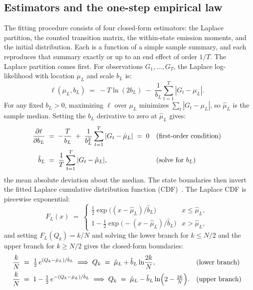 \subsection{Estimators and the one-step empirical law}
\label{sec:supp-gen-estimators}

The fitting procedure consists of four closed-form estimators: the
Laplace partition, the counted transition matrix, the within-state
emission moments, and the initial distribution. Each is a function of
a simple sample summary, and each reproduces that summary exactly or
up to an end effect of order $1/T$. The Laplace partition comes
first. For observations $G_1, \dots, G_T$, the Laplace
log-likelihood with location $\mu_L$ and scale $b_L$ is:
\begin{equation}
  \ell(\mu_L, b_L) \;=\;
  -T \ln (2 b_L) \;-\; \frac{1}{b_L} \sum_{t=1}^{T} |G_t - \mu_L|.
  \label{eq:supp-laplace-ll}
\end{equation}
For any fixed $b_L > 0$, maximizing $\ell$ over $\mu_L$ minimizes
$\sum_t |G_t - \mu_L|$, so $\hat\mu_L$ is the sample median. Setting
the $b_L$ derivative to zero at $\hat\mu_L$ gives:
\begin{align}
  \frac{\partial \ell}{\partial b_L}
   &\;=\; -\frac{T}{b_L}
     \;+\; \frac{1}{b_L^2} \sum_{t=1}^{T} |G_t - \hat\mu_L|
     \;=\; 0
     && \text{(first-order condition)} \notag \\
  \hat b_L
   &\;=\; \frac{1}{T} \sum_{t=1}^{T} |G_t - \hat\mu_L|,
     && \text{(solve for $b_L$)}
  \label{eq:supp-laplace-mle}
\end{align}
the mean absolute deviation about the median. The state boundaries
then invert the fitted Laplace cumulative distribution function
(CDF)~\cite{kotzKozubowskiPodgorski2001}. The Laplace CDF is
piecewise exponential:
\begin{equation}
  F_L(x) \;=\;
  \begin{cases}
    \tfrac{1}{2} \exp\!\big((x - \hat\mu_L)/\hat b_L\big)
      & x \le \hat\mu_L,\\[4pt]
    1 - \tfrac{1}{2} \exp\!\big(-(x - \hat\mu_L)/\hat b_L\big)
      & x > \hat\mu_L,
  \end{cases}
  \label{eq:supp-laplace-cdf}
\end{equation}
and setting $F_L(Q_k) = k/N$ and solving the lower branch for
$k \le N/2$ and the upper branch for $k \ge N/2$ gives the closed-form
boundaries:
\begin{align}
  \frac{k}{N} &\;=\; \tfrac{1}{2}\,
    e^{(Q_k - \hat\mu_L)/\hat b_L}
  \;\Longrightarrow\;
  Q_k \;=\; \hat\mu_L + \hat b_L \ln\!\frac{2k}{N},
    && \text{(lower branch)} \notag \\
  \frac{k}{N} &\;=\; 1 - \tfrac{1}{2}\,
    e^{-(Q_k - \hat\mu_L)/\hat b_L}
  \;\Longrightarrow\;
  Q_k \;=\; \hat\mu_L - \hat b_L
    \ln\!\Big(2 - \tfrac{2k}{N}\Big).
    && \text{(upper branch)}
  \label{eq:supp-quantiles}
\end{align}
